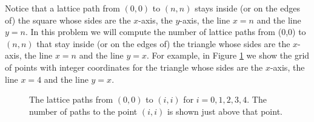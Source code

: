 \itemesi Notice that a  lattice path from $(0,0)$ to $(n,n)$ stays
inside (or on the edges of) the square whose sides are the $x$-axis, the
$y$-axis, the line
$x=n$ and the line $y=n$.  In this problem we will compute the number of
lattice paths from (0,0) to
$(n,n)$ that stay inside (or on the edges of) the triangle whose sides are the
$x$-axis, the line $x=n$ and the line $y=x$.  For example, in Figure
\ref{CatalanPaths} we show the grid of points with integer coordinates for
the triangle whose sides are the $x$-axis, the line $x=4$ and the line $y=x$.
\begin{figure}[htb]\caption{The lattice paths
from $(0,0)$ to $(i,i)$ for $i=0,1,2,3,4$. 
The number of paths to the point $(i,i)$ is
shown just above that point.}\label{CatalanPaths}
\begin{center}\mbox{}
\end{center}
\end{figure}
